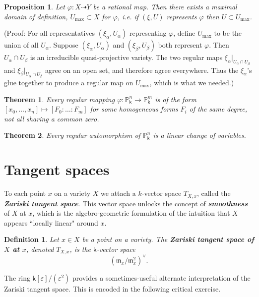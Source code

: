 \documentclass[11pt]{article}
\renewcommand{\P}{\mathbb{P}}
\renewcommand{\k}{\mathsf{k}}
\newcommand{\fm}{\mathfrak{m}}
\renewcommand{\to}{\longrightarrow}
\renewcommand{\k}{\mathsf{k}}
\renewcommand{\P}{\mathbb P}
\renewcommand{\to}{{\longrightarrow}}
\newtheorem{theorem}{Theorem}[section]
\newtheorem{proposition}{Proposition}[section]
\newtheorem{definition}{Definition}[section]
\begin{document}
\begin{proposition}
Let \(\varphi: X \dashrightarrow Y\) be a rational map.  Then there exists a maximal domain of definition, \(U_{\textrm{max}} \subset X\) for \(\varphi\), i.e. if \((\xi,U)\) represents \(\varphi\) then \(U \subset U_{\textrm{max}}\). 
\end{proposition}

(Proof: For all representatives \((\xi_{\alpha}, U_{\alpha})\) representing \(\varphi\), define \(U_{\textrm{max}}\) to be the union of all \(U_\alpha\). Suppose \((\xi_{\alpha}, U_{\alpha})\) and \((\xi_{\beta}, U_{\beta})\) both represent \(\varphi\). Then \(U_{\alpha} \cap U_{\beta}\) is an irreducible quasi-projective variety.  The two regular maps \(\xi_{\alpha}|_{U_{\alpha} \cap U_{\beta}}\) and \(\xi_{\beta}|_{U_{\alpha} \cap U_{\beta}}\) agree on an open set, and therefore agree everywhere.  Thus the \(\xi_{\alpha}\)'s glue together to produce a regular map on \(U_{\textrm{max}}\), which is what we needed.)


\begin{theorem}
Every regular mapping \(\varphi: \P^n_{\k} \to \P^m_{\k}\) is of the form \([x_0, \dots, x_n] \mapsto [F_0: \ldots : F_m]\) for some homogeneous forms \(F_{i}\) of the same degree, not all sharing a common zero.
\end{theorem}

\begin{theorem}
Every regular automorphism of \(\P^n_{\k}\) is a linear change of variables.
\end{theorem}

\section{Tangent spaces}
\label{sec:org725e215}
To each point \(x\) on a variety \(X\) we attach a \(k\)-vector space \(T_{X,x}\), called the \textbf{\emph{Zariski tangent space}}.   This vector space unlocks the concept of \textbf{\emph{smoothness}} of \(X\) at \(x\), which is the  algebro-geometric formulation of the intuition that \(X\) appears ``locally linear" around \(x\). 


\begin{definition}
Let \(x \in X\) be a point on a variety.  The \textbf{\emph{Zariski tangent space of \(X\) at \(x\)}}, denoted \(T_{X,x}\), is the \(\k\)-vector space \[\left( {\fm_{x}}/{\fm_{x}^2} \right)^{\vee}.\]
\end{definition}

The ring \(\k[\varepsilon]/(\varepsilon^2)\) provides a sometimes-useful alternate interpretation of the Zariski tangent space.  This is encoded in the following critical exercise. 
\end{document}
